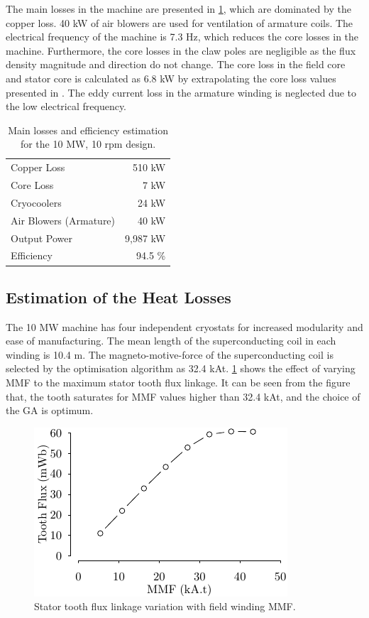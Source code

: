 \documentclass[12pt]{iopart}
\begin{document}
The main losses in the machine are presented in \ref{10MW_efficiency}, which are dominated by the copper loss. 40 kW of air blowers are used for ventilation of armature coils. 
The electrical frequency of the machine is 7.3 Hz, which reduces the core losses in the machine. Furthermore, the core losses in the claw poles are negligible as the flux density magnitude and direction do not change. The core loss in the field core and stator core is calculated as 6.8 kW by extrapolating the core loss values presented in \cite{vacoflux}. The eddy current loss in the armature winding is neglected due to the low electrical frequency.


\begin{table}[t]
  \centering
  \begin{tabular}{lr}
\hline
Copper Loss & 510 kW \\
Core Loss & 7 kW \\
Cryocoolers & 24 kW \\
Air Blowers (Armature) & 40 kW \\
Output Power & 9,987 kW \\
\hline
Efficiency & 94.5 \% \\
\hline
\end{tabular}
  \caption{Main losses and efficiency estimation for the 10 MW, 10 rpm design.}
  \label{10MW_efficiency}
\end{table}

\subsection{Estimation of the Heat Losses}

The 10 MW machine has four independent cryostats for increased modularity and ease of manufacturing. The mean length of the superconducting coil in each winding is 10.4 m. The magneto-motive-force of the superconducting coil is selected by the optimisation algorithm as 32.4 kAt. \ref{10MW_varying_MMF} shows the effect of varying MMF to the maximum stator tooth flux linkage. It can be seen from the figure that, the tooth saturates for MMF values higher than 32.4 kAt, and the choice of the GA is optimum.


\begin{figure}[t]
  \centering
    \includegraphics[]{10MW_varying_MMF}
  \caption{Stator tooth flux linkage variation with field winding MMF.}
  \label{10MW_varying_MMF}
\end{figure}
\end{document}
